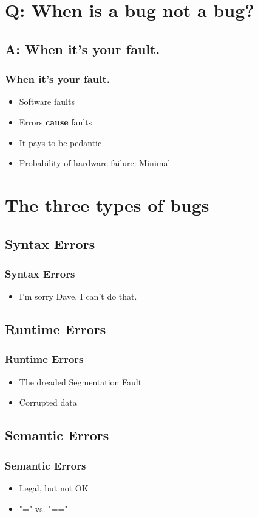 \documentclass{beamer}
\begin{document}
\section{Q: When is a bug not a bug?}
\subsection{A: When it's your fault.}
\frame
{
    \frametitle{When it's your fault.}

    \begin{itemize}
        \item Software faults
        \item Errors \textbf{cause} faults
        \item It pays to be pedantic
        \item Probability of hardware failure: Minimal
    \end{itemize}
}
\section{The three types of bugs}
\subsection{Syntax Errors}
\frame
{
    \frametitle{Syntax Errors}

    \begin{itemize}
        \item I'm sorry Dave, I can't do that.
    \end{itemize}
}
\subsection{Runtime Errors}
\frame
{
    \frametitle{Runtime Errors}

    \begin{itemize}
        \item The dreaded Segmentation Fault
        \item Corrupted data
    \end{itemize}
}
\subsection{Semantic Errors}
\frame
{
    \frametitle{Semantic Errors}

    \begin{itemize}
        \item Legal, but not OK
        \item "=" vs. "=="
    \end{itemize}
}
\end{document}
